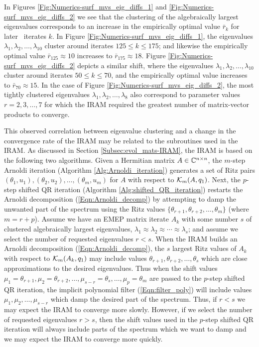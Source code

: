 In Figures \ref{Fig:Numerics-surf_mvs_eig_diffs_1} and \ref{Fig:Numerics-surf_mvs_eig_diffs_2} we see that the clustering of the algebraically largest eigenvalues corresponds to an increase in the empirically optimal value $\bar{r}_k$ for later \emep \ iterates $k$.
In Figure \ref{Fig:Numerics-surf_mvs_eig_diffs_1}, the eigenvalues $\lambda_1, \lambda_2, \ldots, \lambda_{10}$ cluster around iterates $125 \leq k \leq 175$; and likewise the empirically optimal value $\bar{r}_{125} \approx 10$ increases to $\bar{r}_{175} \approx 18$.
Figure \ref{Fig:Numerics-surf_mvs_eig_diffs_2} depicts a similar shift, where the eigenvalues $\lambda_1, \lambda_2, \ldots, \lambda_{10}$ cluster around iterates $50 \leq k \leq 70$, and the empirically optimal value increases to $\bar{r}_{70} \approx 15$.
In the case of Figure \ref{Fig:Numerics-surf_mvs_eig_diffs_2}, the most tightly clustered eigenvalues $\lambda_1, \lambda_2, \ldots, \lambda_{8}$ also correspond to parameter values $r = 2, 3, \ldots, 7$ for which the IRAM required the greatest number of matrix-vector products to converge.



This observed correlation between eigenvalue clustering and a change in the convergence rate of the IRAM may be related to the subroutines used in the IRAM.
As discussed in Section \ref{Subsec:evol_mats-IRAM}, the IRAM is based on the following two algorithms.
Given a Hermitian matrix $A \in {\mathbb C}^{n \times n}$, the $m$-step Arnoldi iteration (Algorithm \ref{Alg:Arnoldi_iteration}) generates a set of Ritz pairs $(\theta_1, u_1), (\theta_2, u_2), \ldots, (\theta_m, u_m)$ for $A$ with respect to ${\mathcal K}_m(A, q_1)$.
Next, the $p$-step shifted QR iteration (Algorithm \ref{Alg:shifted_QR_iteration}) restarts the Arnoldi decomposition (\ref{Eqn:Arnoldi_decomp}) by attempting to damp the unwanted part of the spectrum using the Ritz values $\{ \theta_{r+1}, \theta_{r+2}, \ldots, \theta_m \}$ (where $m = r + p$).
Assume we have an EMEP matrix iterate $A_k$ with some number $s$ of clustered algebraically largest eigenvalues, $\lambda_1 \approx \lambda_2 \approx \cdots \approx \lambda_s$; 
and assume we select the number of requested eigenvalues $r < s$.
When the IRAM builds an Arnoldi decomposition (\ref{Eqn:Arnoldi_decomp}), the $s$ largest Ritz values of $A_k$ with respect to ${\mathcal K}_m(A_k, q_1)$ may include values $\theta_{r+1}, \theta_{r+2}, \ldots, \theta_s$ which are close approximations to the desired eigenvalues.
Thus when the shift values $\mu_1 = \theta_{r+1}, \mu_2 = \theta_{r+2}, \ldots, \mu_{s-r} = \theta_{s}, \ldots, \mu_p = \theta_m$ are passed to the $p$-step shifted QR iteration, the implicit polynomial filter (\ref{Eqn:filter_poly}) will include values $\mu_1, \mu_2, \ldots, \mu_{s-r}$ which damp the desired part of the spectrum.
Thus, if $r < s$ we may expect the IRAM to converge more slowly.
However, if we select the number of requested eigenvalues $r > s$, then the shift values used in the $p$-step shifted QR iteration will always include parts of the spectrum which we want to damp and we may expect the IRAM to converge more quickly. 


